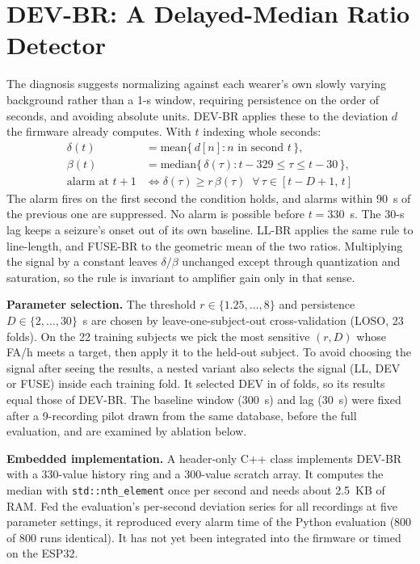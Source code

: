 \documentclass[conference,letterpaper]{IEEEtran}
\begin{document}
\section{DEV-BR: A Delayed-Median Ratio Detector}\label{sec:devbr}
The diagnosis suggests normalizing against each wearer's own slowly varying background rather than a 1-s window, requiring persistence on the order of seconds, and avoiding absolute units. DEV-BR applies these to the deviation $d$ the firmware already computes. With $t$ indexing whole seconds:
\begin{align}
\delta(t) &= \mathrm{mean}\{\,d[n] : n \text{ in second } t\,\},\\
\beta(t) &= \mathrm{median}\{\,\delta(\tau) : t{-}329 \le \tau \le t{-}30\,\},\\
\text{alarm at } t{+}1 &\iff \delta(\tau) \ge r\,\beta(\tau)\;\; \forall\,\tau \in [t{-}D{+}1,\, t]
\end{align}
The alarm fires on the first second the condition holds, and alarms within 90~s of the previous one are suppressed. No alarm is possible before $t{=}330$~s. The 30-s lag keeps a seizure's onset out of its own baseline. LL-BR applies the same rule to line-length, and FUSE-BR to the geometric mean of the two ratios. Multiplying the signal by a constant leaves $\delta/\beta$ unchanged except through quantization and saturation, so the rule is invariant to amplifier gain only in that sense.

\textbf{Parameter selection.} The threshold $r\in\{1.25,\dots,8\}$ and persistence $D\in\{2,\dots,30\}$~s are chosen by leave-one-subject-out cross-validation (LOSO, 23 folds). On the 22 training subjects we pick the most sensitive $(r,D)$ whose FA/h meets a target, then apply it to the held-out subject. To avoid choosing the signal after seeing the results, a nested variant also selects the signal (LL, DEV or FUSE) inside each training fold. It selected DEV in \NestedDev{} of \NestedAll{} folds, so its results equal those of DEV-BR. The baseline window (300~s) and lag (30~s) were fixed after a 9-recording pilot drawn from the same database, before the full evaluation, and are examined by ablation below.

\textbf{Embedded implementation.} A header-only C++ class implements DEV-BR with a 330-value history ring and a 300-value scratch array. It computes the median with \texttt{std::nth\_element} once per second and needs about 2.5~KB of RAM. Fed the evaluation's per-second deviation series for all \NRec{} recordings at five parameter settings, it reproduced every alarm time of the Python evaluation (800 of 800 runs identical). It has not yet been integrated into the firmware or timed on the ESP32.
\end{document}
